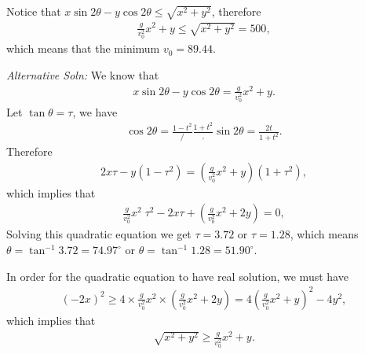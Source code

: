 \documentclass{article}
\begin{document}
\begin{enumerate}
Notice that $x\sin 2\theta - y \cos 2\theta \leq \sqrt{x^2+y^2}$, therefore
\begin{align*}
 \frac{g}{v_0^2}x^2 + y \leq \sqrt{x^2+y^2} = 500, 
\end{align*}
which means that the minimum $v_0 = 89.44$.

\emph{Alternative Soln:} We know that
\begin{align*}
    x \sin 2\theta - y\cos 2\theta = \frac{g}{v_0^2}x^2 + y.
\end{align*}
Let $\tan \theta = \tau$, we have
\begin{align*}
  \cos 2\theta = \frac{1-t^2}/\frac{1+t^2}, \sin 2\theta = \frac{2t}{1+t^2}.
\end{align*}
Therefore
\begin{align*}
 2x \tau - y(1-\tau^2) = \left(\frac{g}{v_0^2}x^2+y\right) (1+\tau^2),
\end{align*}
which implies that
\begin{align*}
  \frac{g}{v_0^2}x^2\; \tau^2 -2x\tau + \left(\frac{g}{v_0^2}x^2+2y\right) = 0,
\end{align*}
Solving this quadratic equation we get $\tau = 3.72$ or $\tau = 1.28$, which means $\theta = \tan^{-1} 3.72 = 74.97^\circ$ or $\theta = \tan^{-1}1.28 = 51.90^\circ$.

In order for the quadratic equation to have real solution, we must have
\begin{align*}
 (-2x) ^2 \geq 4 \times \frac{g}{v_0^2}x^2 \times \left(\frac{g}{v_0^2}x^2+2y\right) = 4\left(\frac{g}{v_0^2}x^2+y\right)^2-4y^2,
\end{align*}
which implies that
\begin{align*}
 \sqrt{ x^2+y^2 }\geq \frac{g}{v_0^2}x^2+y.
\end{align*}



\end{enumerate}
\end{document}
